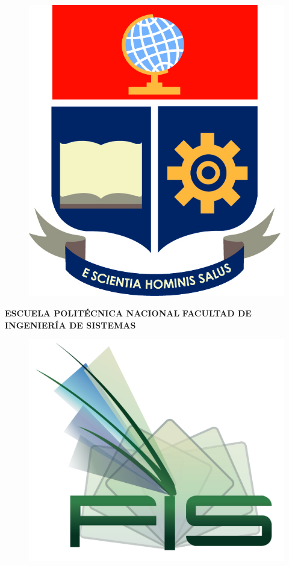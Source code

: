 \documentclass[10pt, a4paper]{article}
\begin{document}
\begin{center}
\begin{figure}[t]
    \centering
    \includegraphics[scale=0.15]{solo logoEPN.jpg}
    \vspace{0cm}
\end{figure}
    \noindent \huge \textbf{ESCUELA POLITÉCNICA NACIONAL}\vspace{0.5cm}
    \noindent \huge \textbf{FACULTAD DE INGENIERÍA DE SISTEMAS}\vspace{0.5CM}
    \begin{figure}[h]
        \centering
        \includegraphics[scale=0.15]{logo-FIS-sin-fondo.png}
    \end{figure}
\end{center}
\end{document}

